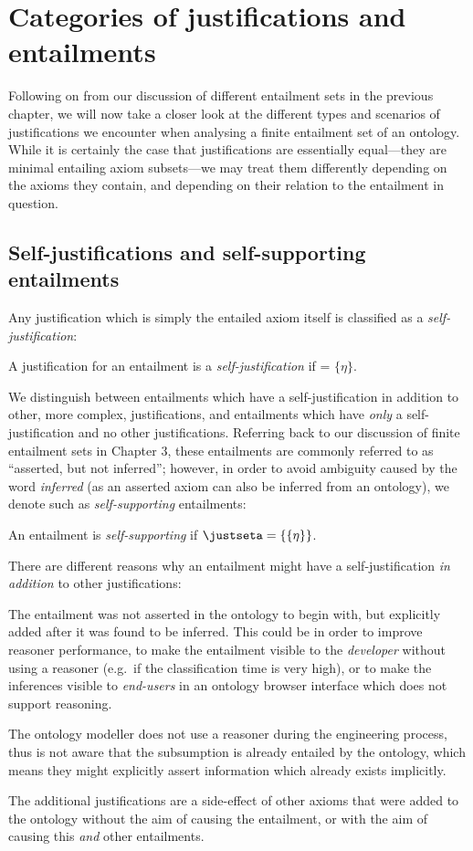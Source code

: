 \section{Categories of justifications and entailments}
Following on from our discussion of different entailment sets in the previous chapter, we will now take a closer look at the different types and scenarios of justifications we encounter when analysing a finite entailment set of an ontology. While it is certainly the case that justifications are essentially equal---they are minimal entailing axiom subsets---we may treat them differently depending on the axioms they contain, and depending on their relation to the entailment in question.

\subsection{Self-justifications and self-supporting entailments}
Any justification which is simply the entailed axiom itself is classified as a \emph{self-justification}:
\begin{defn}
A justification \J for an entailment \ent is a \emph{self-justification} if \J = $\{\eta\}$.
\end{defn}
We distinguish between entailments which have a self-justification in addition to other, more complex, justifications, and entailments which have \emph{only} a self-justification and no other justifications. Referring back to our discussion of finite entailment sets in Chapter 3, these entailments are commonly referred to as \enquote{asserted, but not inferred}; however, in order to avoid ambiguity caused by the word \emph{inferred} (as an asserted axiom can also be inferred from an ontology), we denote such as \emph{self-supporting} entailments: 
\begin{defn}
An entailment \ent is \emph{self-supporting} if $\justseta = \{\{\eta\}\}$.
\end{defn}
There are different reasons why an entailment might have a self-justification \emph{in addition} to other justifications: 
\begin{compactenum}
\item The entailment was not asserted in the ontology to begin with, but explicitly added after it was found to be inferred. This could be in order to improve reasoner performance, to make the entailment visible to the \emph{developer} without using a reasoner (e.g.\ if the classification time is very high), or to make the inferences visible to \emph{end-users} in an ontology browser interface which does not support reasoning. 
\item The ontology modeller does not use a reasoner during the engineering process, thus is not aware that the subsumption is already entailed by the ontology, which means they might explicitly assert information which already exists implicitly.
\item The additional justifications are a side-effect of other axioms that were added to the ontology without the aim of causing the entailment, or with the aim of causing this \emph{and}  other entailments.
\end{compactenum}
